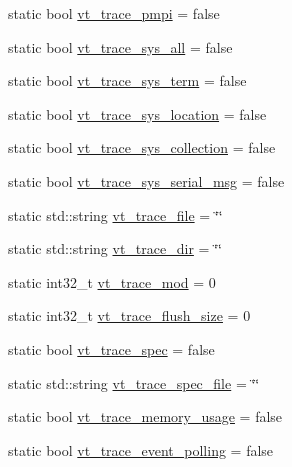 \begin{DoxyCompactItemize}
\item 
static bool \hyperlink{structvt_1_1arguments_1_1_arg_config_a1d571ab4a4c130617b7fe0b6827c7196}{vt\+\_\+trace\+\_\+pmpi} = false
\item 
static bool \hyperlink{structvt_1_1arguments_1_1_arg_config_a0f29a730468e776a3281e5cb2694395c}{vt\+\_\+trace\+\_\+sys\+\_\+all} = false
\item 
static bool \hyperlink{structvt_1_1arguments_1_1_arg_config_a3618f4c676020355d57dd29623959224}{vt\+\_\+trace\+\_\+sys\+\_\+term} = false
\item 
static bool \hyperlink{structvt_1_1arguments_1_1_arg_config_ad810a33c24ce08006af0bafeffce9ec8}{vt\+\_\+trace\+\_\+sys\+\_\+location} = false
\item 
static bool \hyperlink{structvt_1_1arguments_1_1_arg_config_ac4afb6f023f686f3ed1643394d3ea80c}{vt\+\_\+trace\+\_\+sys\+\_\+collection} = false
\item 
static bool \hyperlink{structvt_1_1arguments_1_1_arg_config_a44627a2ab6723ed7646511a12124325e}{vt\+\_\+trace\+\_\+sys\+\_\+serial\+\_\+msg} = false
\item 
static std\+::string \hyperlink{structvt_1_1arguments_1_1_arg_config_a296fe4ab5d11f984532b780ffcf74657}{vt\+\_\+trace\+\_\+file} = \char`\"{}\char`\"{}
\item 
static std\+::string \hyperlink{structvt_1_1arguments_1_1_arg_config_aa30e39d83c2391ff918f86f8d5009b3f}{vt\+\_\+trace\+\_\+dir} = \char`\"{}\char`\"{}
\item 
static int32\+\_\+t \hyperlink{structvt_1_1arguments_1_1_arg_config_acb14bb6b6f58db2a35bc71a4c6c06799}{vt\+\_\+trace\+\_\+mod} = 0
\item 
static int32\+\_\+t \hyperlink{structvt_1_1arguments_1_1_arg_config_a8f122ed882f2de1f03091edbe64f1f2b}{vt\+\_\+trace\+\_\+flush\+\_\+size} = 0
\item 
static bool \hyperlink{structvt_1_1arguments_1_1_arg_config_a5985e792d6c3810293b54dda059460bd}{vt\+\_\+trace\+\_\+spec} = false
\item 
static std\+::string \hyperlink{structvt_1_1arguments_1_1_arg_config_a0369ed37706b8e7d563cd8f25763a56c}{vt\+\_\+trace\+\_\+spec\+\_\+file} = \char`\"{}\char`\"{}
\item 
static bool \hyperlink{structvt_1_1arguments_1_1_arg_config_aa4ca0b4d3eedbe726b0c50d178dfb3bf}{vt\+\_\+trace\+\_\+memory\+\_\+usage} = false
\item 
static bool \hyperlink{structvt_1_1arguments_1_1_arg_config_a74daad7ed23750406ce4122cf8e9cfdd}{vt\+\_\+trace\+\_\+event\+\_\+polling} = false

\end{DoxyCompactItemize}
